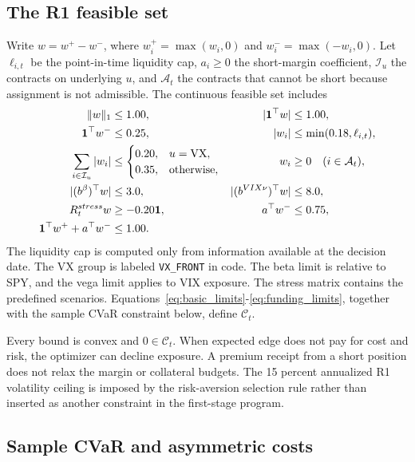 \subsection{The R1 feasible set}

Write \(w=w^+-w^-\), where \(w_i^+=\max(w_i,0)\) and
\(w_i^-=\max(-w_i,0)\). Let \(\ell_{i,t}\) be the point-in-time liquidity cap,
\(a_i\ge0\) the short-margin coefficient, \(\mathcal I_u\) the contracts on underlying
\(u\), and \(\mathcal A_t\) the contracts that cannot be short because assignment is not
admissible. The continuous feasible set includes
\begin{align}
  \|w\|_1&\le1.00, & |\mathbf{1}^\top w|&\le1.00, \label{eq:basic_limits}\\
  \mathbf{1}^\top w^-&\le0.25,
    & |w_i|&\le\min(0.18,\ell_{i,t}), \label{eq:position_limits}\\
  \sum_{i\in\mathcal I_u}|w_i|&\le
    \begin{cases}0.20,&u=\text{VX},\\0.35,&\text{otherwise},\end{cases}
    & w_i&\ge0\quad(i\in\mathcal A_t), \label{eq:underlying_limits}\\
  |(b^{\beta})^\top w|&\le3.0,
    & |(b^{VIX\nu})^\top w|&\le8.0, \label{eq:exposure_limits}\\
  R^{stress}_tw&\ge-0.20\mathbf{1},
    & a^\top w^-&\le0.75, \label{eq:stress_margin_limits}\\
  \mathbf{1}^\top w^++a^\top w^-&\le1.00. && \label{eq:funding_limits}
\end{align}
The liquidity cap is computed only from information available at the decision date. The
VX group is labeled \texttt{VX\_FRONT} in code. The beta limit is relative to SPY, and
the vega limit applies to VIX exposure. The stress matrix contains the predefined
scenarios. Equations~\eqref{eq:basic_limits}-\eqref{eq:funding_limits}, together with the
sample CVaR constraint below, define \(\mathcal C_t\).

Every bound is convex and \(0\in\mathcal C_t\). When expected edge does not pay for cost
and risk, the optimizer can decline exposure. A
premium receipt from a short position does not relax the margin or collateral budgets.
The 15 percent annualized R1 volatility ceiling is imposed by the risk-aversion selection
rule rather than inserted as another constraint in the first-stage program.

\subsection{Sample CVaR and asymmetric costs}

